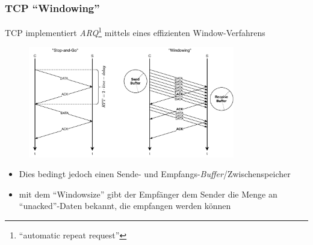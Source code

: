 \documentclass[ignorenonframetext]{beamer}
\begin{document}

\begin{frame}
\frametitle{TCP ``Windowing''}
\begin{small}
TCP implementiert {\em ARQ}\footnote{``automatic repeat request''} mittels eines effizienten Window-Verfahrens
\end{small}
\begin{figure}
\centering
\includegraphics[width=9cm]{tcp-windowing-rationale} 
\end{figure}

\begin{tiny}
\begin{itemize}
  \item Dies bedingt jedoch einen Sende- und Empfangs-{\em Buffer}/Zwischenspeicher
  \item mit dem ``Windowsize'' gibt der Empf\"anger dem Sender die Menge an ``unacked''-Daten bekannt, die empfangen werden k\"onnen
\end{itemize}
\end{tiny}
\end{frame}
\end{document}
